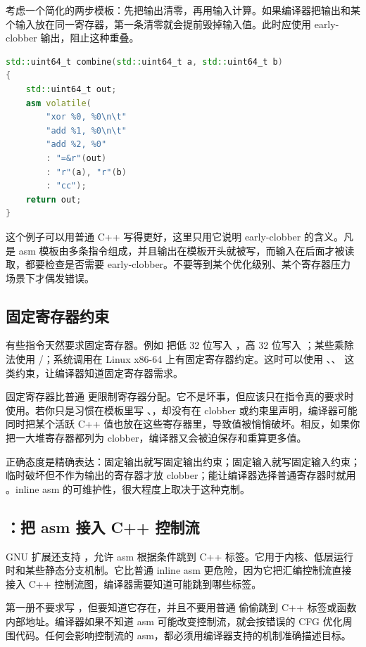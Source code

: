考虑一个简化的两步模板：先把输出清零，再用输入计算。如果编译器把输出和某个输入放在同一寄存器，第一条清零就会提前毁掉输入值。此时应使用 early-clobber 输出，阻止这种重叠。

\begin{lstlisting}[language=C++]
std::uint64_t combine(std::uint64_t a, std::uint64_t b)
{
    std::uint64_t out;
    asm volatile(
        "xor %0, %0\n\t"
        "add %1, %0\n\t"
        "add %2, %0"
        : "=&r"(out)
        : "r"(a), "r"(b)
        : "cc");
    return out;
}
\end{lstlisting}

这个例子可以用普通 C++ 写得更好，这里只用它说明 early-clobber 的含义。凡是 asm 模板由多条指令组成，并且输出在模板开头就被写，而输入在后面才被读取，都要检查是否需要 early-clobber。不要等到某个优化级别、某个寄存器压力场景下才偶发错误。

\subsection{固定寄存器约束}

有些指令天然要求固定寄存器。例如  把低 32 位写入 ，高 32 位写入 ；某些乘除法使用 /；系统调用在 Linux x86-64 上有固定寄存器约定。这时可以使用 、、 这类约束，让编译器知道固定寄存器需求。

固定寄存器比普通  更限制寄存器分配。它不是坏事，但应该只在指令真的要求时使用。若你只是习惯在模板里写 、，却没有在 clobber 或约束里声明，编译器可能同时把某个活跃 C++ 值也放在这些寄存器里，导致值被悄悄破坏。相反，如果你把一大堆寄存器都列为 clobber，编译器又会被迫保存和重算更多值。

正确态度是精确表达：固定输出就写固定输出约束；固定输入就写固定输入约束；临时破坏但不作为输出的寄存器才放 clobber；能让编译器选择普通寄存器时就用 。inline asm 的可维护性，很大程度上取决于这种克制。

\subsection{：把 asm 接入 C++ 控制流}

GNU 扩展还支持 ，允许 asm 根据条件跳到 C++ 标签。它用于内核、低层运行时和某些静态分支机制。它比普通 inline asm 更危险，因为它把汇编控制流直接接入 C++ 控制流图，编译器需要知道可能跳到哪些标签。

第一册不要求写 ，但要知道它存在，并且不要用普通  偷偷跳到 C++ 标签或函数内部地址。编译器如果不知道 asm 可能改变控制流，就会按错误的 CFG 优化周围代码。任何会影响控制流的 asm，都必须用编译器支持的机制准确描述目标。

